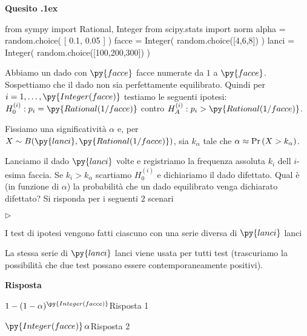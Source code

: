 \documentclass[11pt,twoside,a4paper]{article}
\newcommand{\mylabel}[1]{#1\hfill}
\renewenvironment{itemize}
  {\begin{list}{$\triangleright$}{%
   \setlength{\parskip}{0mm}
   \setlength{\topsep}{.4\baselineskip}
   \setlength{\rightmargin}{0mm}
   \setlength{\listparindent}{0mm}
   \setlength{\itemindent}{0mm}
   \setlength{\labelwidth}{2ex}
   \setlength{\itemsep}{.4\baselineskip}
   \setlength{\parsep}{0mm}
   \setlength{\partopsep}{0mm}
   \setlength{\labelsep}{1ex}
   \setlength{\leftmargin}{\labelwidth+\labelsep}
   \let\makelabel\mylabel}}{%
   \end{list}\vspace*{-1.3mm}}
\def\Pr{{\rm Pr\,}}
\newcounter{quesito}
\newenvironment{question}{\bigskip\addtocounter{quesito}{1}\par\textbf{Quesito \thequesito.\kern1ex}}{\vspace{\parskip}}
\newenvironment{answer}{\par\textbf{Risposta\quad}}{\vspace{\parskip}}
\begin{document}
\begin{question} %
\begin{pycode}
from sympy import Rational, Integer
from scipy.stats import norm
alpha = random.choice( [ 0.1, 0.05 ] ) 
facce = Integer( random.choice([4,6,8]) )
lanci = Integer( random.choice([100,200,300]) )
\end{pycode}
Abbiamo un dado con $\py{facce}$ facce numerate da $1$ a $\py{facce}$. Sospettiamo che il dado non sia perfettamente equilibrato. Quindi per $i=1,\dots,\py{Integer(facce)}$ testiamo le seguenti ipotesi: $H^{(i)}_0:p_i=\py{Rational(1/facce)}$ contro $H^{(i)}_A:p_i>\py{Rational(1/facce)}$.

Fissiamo una significatività $\alpha$ e, per $X\sim B(\py{lanci}, \py{Rational(1/facce) } )$, sia $k_\alpha$ tale che $\alpha\approx\Pr(X>k_\alpha)$. 

Lanciamo il dado $\py{lanci}$ volte e registriamo la frequenza assoluta $k_i$ dell $i$-esima faccia. Se $k_i>k_\alpha$ scartiamo $H^{(i)}_0$ e dichiariamo il dado difettato. Qual è (in funzione di $\alpha$) la probabilità che un dado equilibrato venga dichiarato difettato? Si risponda per i seguenti $2$ scenari

\begin{itemize}
\item[1.] I test di ipotesi vengono fatti ciascuno con una serie diversa di $\py{lanci}$ lanci
\item[2.] La stessa serie di $\py{lanci}$ lanci viene usata per tutti test (trascuriamo la possibilità che due test possano essere contemporaneamente positivi).
\end{itemize}

\begin{answer}

{\color{blue}$1 - (1-\alpha)^{\py{Integer(facce) } }$\hfill Risposta 1}

{\color{blue}$\py{Integer(facce) }\,\alpha$\hfill Risposta 2}

\end{answer}
\end{question}
\end{document}

